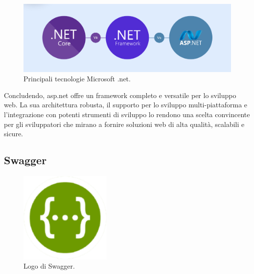 
\begin{figure}[H]
\centering
\includegraphics[width=1\textwidth]{Images/net vs.jpg}
\caption{\label{fig:net vs}Principali tecnologie Microsoft \gls{.net}.}
\end{figure}

Concludendo, \acrshort{asp.net} offre un \gls{framework} completo e versatile per lo sviluppo web. La sua architettura robusta, il supporto per lo sviluppo multi-piattaforma e l'integrazione con potenti strumenti di sviluppo lo rendono una scelta convincente per gli sviluppatori che mirano a fornire soluzioni web di alta qualità, scalabili e sicure.


\subsection{Swagger}\label{subsec:swagger}
\begin{figure}[H]
\centering
\includegraphics[width=0.4\textwidth]{Images/Swagger-logo.png}
\caption{\label{fig:swaggerlogo}Logo di Swagger.}
\end{figure}

